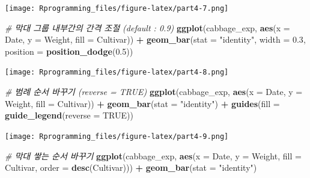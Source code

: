 \documentclass[10pt,]{krantz}
\makeatletter
\newenvironment{Shaded}{\begin{snugshade}}{\end{snugshade}}
\newcommand{\KeywordTok}[1]{\textcolor[rgb]{0.13,0.29,0.53}{\textbf{#1}}}
\newcommand{\DataTypeTok}[1]{\textcolor[rgb]{0.13,0.29,0.53}{#1}}
\newcommand{\FloatTok}[1]{\textcolor[rgb]{0.00,0.00,0.81}{#1}}
\newcommand{\StringTok}[1]{\textcolor[rgb]{0.31,0.60,0.02}{#1}}
\newcommand{\CommentTok}[1]{\textcolor[rgb]{0.56,0.35,0.01}{\textit{#1}}}
\newcommand{\OtherTok}[1]{\textcolor[rgb]{0.56,0.35,0.01}{#1}}
\newcommand{\OperatorTok}[1]{\textcolor[rgb]{0.81,0.36,0.00}{\textbf{#1}}}
\newcommand{\NormalTok}[1]{#1}
\newenvironment{kframe}{%
\medskip{}
\setlength{\fboxsep}{.8em}
 \def\at@end@of@kframe{}%
 \ifinner\ifhmode%
  \def\at@end@of@kframe{\end{minipage}}%
  \begin{minipage}{\columnwidth}%
 \fi\fi%
 \def\FrameCommand##1{\hskip\@totalleftmargin \hskip-\fboxsep
 \colorbox{shadecolor}{##1}\hskip-\fboxsep
     \hskip-\linewidth \hskip-\@totalleftmargin \hskip\columnwidth}%
 \MakeFramed {\advance\hsize-\width
   \@totalleftmargin\z@ \linewidth\hsize
   \@setminipage}}%
 {\par\unskip\endMakeFramed%
 \at@end@of@kframe}
\renewenvironment{Shaded}{\begin{kframe}}{\end{kframe}}
\theoremstyle{definition}
\theoremstyle{definition}
\theoremstyle{remark}
\makeatother
\begin{document}
\texttt{[image: Rprogramming\_files/figure-latex/part4-7.png]}

\begin{Shaded}
\begin{Highlighting}[]


\CommentTok{# 막대 그룹 내부간의 간격 조절 (default : 0.9)}
\KeywordTok{ggplot}\NormalTok{(cabbage_exp, }\KeywordTok{aes}\NormalTok{(}\DataTypeTok{x =}\NormalTok{ Date, }\DataTypeTok{y =}\NormalTok{ Weight, }\DataTypeTok{fill =}\NormalTok{ Cultivar)) }\OperatorTok{+}\StringTok{ }\KeywordTok{geom_bar}\NormalTok{(}\DataTypeTok{stat =} \StringTok{"identity"}\NormalTok{, }\DataTypeTok{width =} \FloatTok{0.3}\NormalTok{, }\DataTypeTok{position =} \KeywordTok{position_dodge}\NormalTok{(}\FloatTok{0.5}\NormalTok{))}
\end{Highlighting}
\end{Shaded}

\texttt{[image: Rprogramming\_files/figure-latex/part4-8.png]}

\begin{Shaded}
\begin{Highlighting}[]


\CommentTok{# 범례 순서 바꾸기 (reverse = TRUE) }
\KeywordTok{ggplot}\NormalTok{(cabbage_exp, }\KeywordTok{aes}\NormalTok{(}\DataTypeTok{x =}\NormalTok{ Date, }\DataTypeTok{y =}\NormalTok{ Weight, }\DataTypeTok{fill =}\NormalTok{ Cultivar)) }\OperatorTok{+}\StringTok{ }\KeywordTok{geom_bar}\NormalTok{(}\DataTypeTok{stat =} \StringTok{"identity"}\NormalTok{) }\OperatorTok{+}\StringTok{ }\KeywordTok{guides}\NormalTok{(}\DataTypeTok{fill =} \KeywordTok{guide_legend}\NormalTok{(}\DataTypeTok{reverse =} \OtherTok{TRUE}\NormalTok{))}
\end{Highlighting}
\end{Shaded}

\texttt{[image: Rprogramming\_files/figure-latex/part4-9.png]}

\begin{Shaded}
\begin{Highlighting}[]


\CommentTok{# 막대 쌓는 순서 바꾸기  }
\KeywordTok{ggplot}\NormalTok{(cabbage_exp, }\KeywordTok{aes}\NormalTok{(}\DataTypeTok{x =}\NormalTok{ Date, }\DataTypeTok{y =}\NormalTok{ Weight, }\DataTypeTok{fill =}\NormalTok{ Cultivar, }\DataTypeTok{order =} \KeywordTok{desc}\NormalTok{(Cultivar))) }\OperatorTok{+}\StringTok{ }\KeywordTok{geom_bar}\NormalTok{(}\DataTypeTok{stat =} \StringTok{"identity"}\NormalTok{)}
\end{Highlighting}
\end{Shaded}
\end{document}
